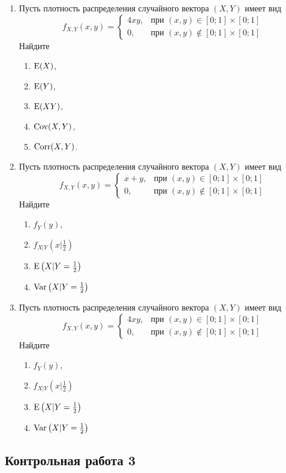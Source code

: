 \begin{enumerate}
\item Пусть плотность распределения случайного вектора $(X,Y)$ имеет вид
\[
f_{X,Y}(x,y) =
\begin{cases}
4xy, & \text{при } (x,y) \in [0;1] \times [0;1] \\
0 , & \text{при } (x,y) \not\in [0;1] \times [0;1]
\end{cases}
\]
Найдите
\begin{enumerate}
\item $\operatorname{E}(X)$,
\item $\operatorname{E}(Y)$,
\item $\operatorname{E}(XY)$,
\item $\operatorname{Cov}(X,Y)$,
\item $\operatorname{Corr}(X,Y)$.
\end{enumerate}

\item Пусть плотность распределения случайного вектора $(X,Y)$ имеет вид
\[
f_{X,Y}(x,y) =
\begin{cases}
x+y, & \text{при } (x,y) \in [0;1] \times [0;1] \\
0 , & \text{при } (x,y) \not\in [0;1] \times [0;1]
\end{cases}
\]
Найдите
\begin{enumerate}
\item $f_{Y}(y)$,
\item $f_{X|Y}\left(x|\frac{1}{2}\right)$
\item $\operatorname{E}\left(X|Y = \frac{1}{2}\right)$
\item $\operatorname{Var}\left(X|Y = \frac{1}{2}\right)$
\end{enumerate}

\item Пусть плотность распределения случайного вектора $(X,Y)$ имеет вид
\[
f_{X,Y}(x,y) =
\begin{cases}
4xy, & \text{при } (x,y) \in [0;1] \times [0;1] \\
0 , & \text{при } (x,y) \not\in [0;1] \times [0;1]
\end{cases}
\]
Найдите
\begin{enumerate}
\item $f_{Y}(y)$,
\item $f_{X|Y}\left(x|\frac{1}{2}\right)$
\item $\operatorname{E}\left(X|Y = \frac{1}{2}\right)$
\item $\operatorname{Var}\left(X|Y = \frac{1}{2}\right)$
\end{enumerate}
\end{enumerate}

\newpage
\subsection{Контрольная работа 3}

